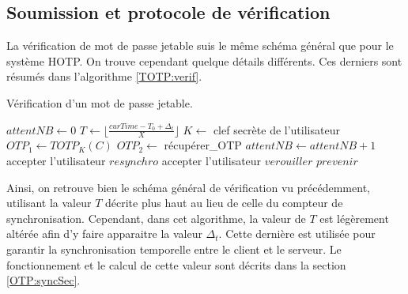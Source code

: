\documentclass{../res/univ-projet}
\begin{document}
  \subsection{Soumission et protocole de vérification}
    La vérification de mot de passe jetable suis le même schéma général que pour le système \og{}HOTP\fg{}. On trouve cependant quelque détails différents. Ces derniers 
    sont résumés dans l'algorithme \ref{TOTP:verif}.
    \begin{algorithm}
      \caption{Vérification d'un mot de passe jetable.}
      \label{TOTP:verif}
      
      \begin{algorithmic}
        \STATE $attentNB \leftarrow 0$
        \STATE $T \leftarrow \lfloor{}\frac{curTime - T_0 + \Delta_t}{X}\rfloor{}$
        \STATE $K \leftarrow$ clef secrète de l'utilisateur
        \STATE $OTP_1 \leftarrow TOTP_K(C)$
          \STATE $OTP_2 \leftarrow$ récupérer\_OTP
          \STATE $attentNB \leftarrow attentNB + 1$
            \STATE accepter l'utilisateur
          \ELSE
              \STATE $resynchro$
              \STATE accepter l'utilisateur
            \ENDIF
          \ENDIF
        \ENDWHILE
        \STATE $verouiller$
        \STATE $prevenir$
      \end{algorithmic}
    \end{algorithm}
    Ainsi, on retrouve bien le schéma général de vérification vu précédemment, utilisant la valeur $T$ décrite plus haut au lieu de celle du compteur de synchronisation.
    Cependant, dans cet algorithme, la valeur de $T$ est légèrement altérée afin d'y faire apparaitre la valeur $\Delta_t$. Cette dernière est utilisée pour garantir la 
    synchronisation temporelle entre le client et le serveur. Le fonctionnement et le calcul de cette valeur sont décrits dans la section \ref{OTP:syncSec}.
    
\end{document}
